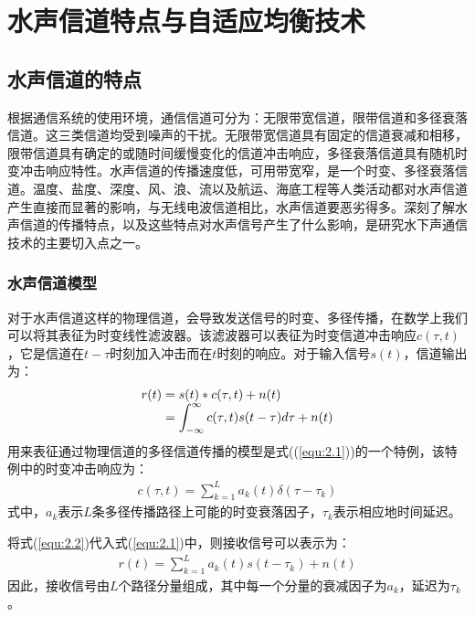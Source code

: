 %
\chapter{水声信道特点与自适应均衡技术}
\thispagestyle{empty}

\section{水声信道的特点}
根据通信系统的使用环境，通信信道可分为：无限带宽信道，限带信道和多径衰落信道\citep{ProakisB2001}。这三类信道均受到噪声的干扰。无限带宽信道具有固定的信道衰减和相移，限带信道具有确定的或随时间缓慢变化的信道冲击响应，多径衰落信道具有随机时变冲击响应特性。水声信道的传播速度低，可用带宽窄，是一个时变、多径衰落信道。温度、盐度、深度、风、浪、流以及航运、海底工程等人类活动都对水声信道产生直接而显著的影响，与无线电波信道相比，水声信道要恶劣得多。深刻了解水声信道的传播特点，以及这些特点对水声信号产生了什么影响，是研究水下声通信技术的主要切入点之一。
\subsection{水声信道模型}
对于水声信道这样的物理信道，会导致发送信号的时变、多径传播，在数学上我们可以将其表征为时变线性滤波器。该滤波器可以表征为时变信道冲击响应$c(\tau,t)$，它是信道在$t-\tau$时刻加入冲击而在$t$时刻的响应。对于输入信号$s(t)$，信道输出为：
\begin{eqnarray}
    \begin{array}{l@{\;=\;}l}
        r(t)&s(t)*c(\tau,t)+n(t)\\
        &\displaystyle\int_{-\infty}^{\infty}c(\tau,t)s(t-\tau)d\tau+n(t)\\
    \end{array}
    \label{equ:2.1}
\end{eqnarray}
用来表征通过物理信道的多径信道传播的模型是式((\ref{equ:2.1}))的一个特例，该特例中的时变冲击响应为：
\begin{eqnarray}
    c(\tau,t)=\sum_{k=1}^La_k(t)\delta(\tau-\tau_k)
    \label{equ:2.2}
\end{eqnarray}
式中，$a_k$表示$L$条多径传播路径上可能的时变衰落因子，$\tau_k$表示相应地时间延迟。

将式(\ref{equ:2.2})代入式(\ref{equ:2.1})中，则接收信号可以表示为：
\begin{eqnarray}
    r(t)=\sum_{k=1}^La_k(t)s(t-\tau_k)+n(t)
    \label{equ:2.3}
\end{eqnarray}
因此，接收信号由$L$个路径分量组成，其中每一个分量的衰减因子为$a_k$，延迟为$\tau_k$。

